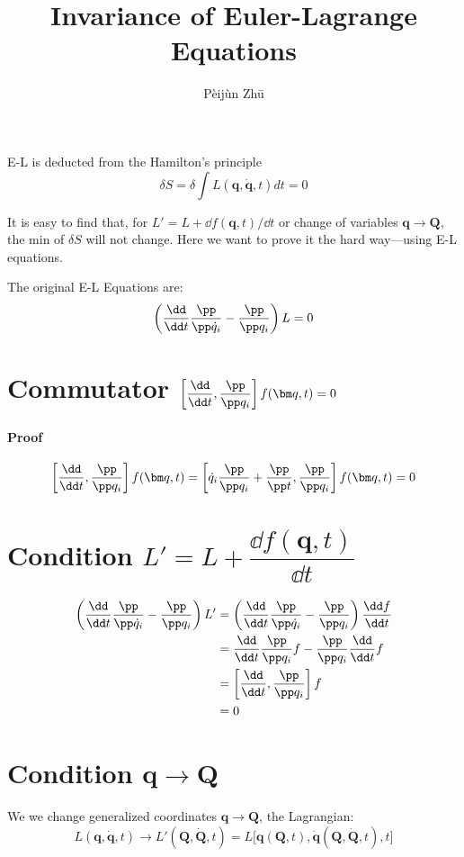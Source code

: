 \documentclass[12pt]{article}
\title{Invariance of Euler-Lagrange Equations}
\author{P\`eij\`un Zh\=u}
\begin{document}
\maketitle

E-L is deducted from the Hamilton's principle \[\delta S=\delta\int L(\bm q, \dot{\bm q}, t)dt=0\]

It is easy to find that, for $L'=L+\dd f(\bm q, t)/\dd t$ or change of variables $\bm q\to\bm Q$, the min of $\delta S$ will not change. Here we want to prove it the hard way---using E-L equations. 

The original E-L Equations are:
\[\left(\frac{\dd}{\dd t}\frac{\pp}{\pp \dot q_i}-\frac{\pp}{\pp q_i}\right)L=0\]

\section{Commutator $\left [\dfrac{\dd}{\dd t}, \dfrac{\pp}{\pp q_i}\right ]f(\bm q, t)=0$}

\paragraph{Proof}
\[
\left[\frac{\dd}{\dd t},\frac{\pp}{\pp q_i}\right]f(\bm q, t) = \left[\dot q_i\frac{\pp}{\pp q_i}+\frac{\pp}{\pp t},\frac{\pp}{\pp q_i}\right]f(\bm q, t)=0
\]

\section{Condition $L'=L+\dfrac{\dd f(\bm q, t)}{\dd t}$}
\begin{align*}
\left(\frac{\dd}{\dd t}\frac{\pp}{\pp \dot q_i}-\frac{\pp}{\pp q_i}\right)L'
&=\left(\frac{\dd}{\dd t}\frac{\pp}{\pp \dot q_i}-\frac{\pp}{\pp q_i}\right)\frac{\dd f}{\dd t}\\
&=\frac{\dd}{\dd t}\frac{\pp}{\pp q_i}f-\frac{\pp}{\pp q_i}\frac{\dd}{\dd t}f\\
&=\left[\frac{\dd}{\dd t},\frac{\pp}{\pp q_i}\right]f\\
&=0
\end{align*}

\section{Condition $\bm q\to\bm Q$}
We we change generalized coordinates $\bm q\to\bm Q$, the Lagrangian:
\[L(\bm q, \dot{\bm q}, t)\to L'(\bm Q, \dot{\bm Q}, t)=L\big[\bm q(\bm Q, t), \dot{\bm q}(\bm Q, \dot{\bm Q}, t), t\big]\]
\end{document}
